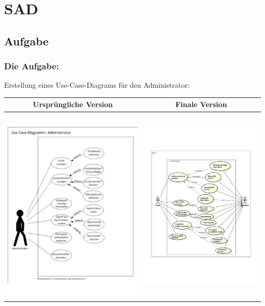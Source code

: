 \section{SAD}
\subsection{Aufgabe}
\begin{frame} %
  \frametitle{Die Aufgabe:} %
Erstellung eines Use-Case-Diagrams für den Administrator:
\newline
\newline
\begin{tabular}{c|c}
	Ursprüngliche Version & Finale Version\\
	\hline
		\includegraphics[width=0.4\linewidth]{./Source/UseCaseAdministrator_alt_11.pdf}
		&
		\includegraphics[width=0.4\linewidth]{./Source/UseCaseAdministrator_11.pdf}
\end{tabular}\\


\end{frame}

